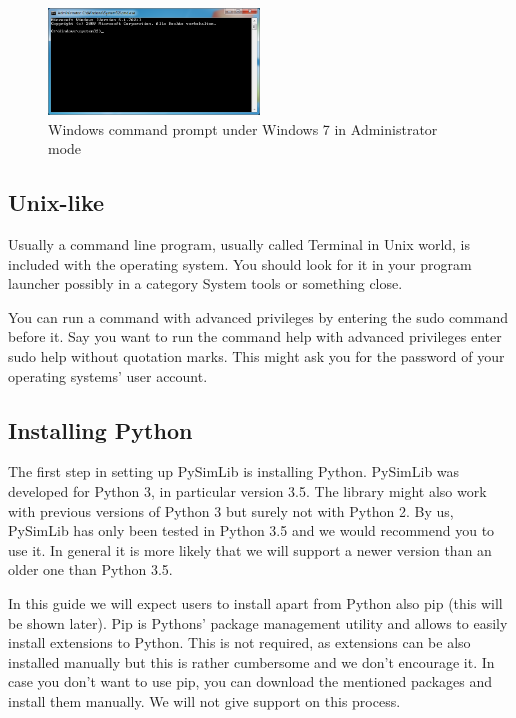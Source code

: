 \begin{figure}[h]
	\centering
	\includegraphics[width=0.5\textwidth]{images/cmd.png}
	\caption{Windows command prompt under Windows 7 in Administrator mode}
	\label{wincmd}
\end{figure}



\subsection{Unix-like}
Usually a command line program, usually called Terminal in Unix world, is included with the operating system.
You should look for it in your program launcher possibly in a category \grqq{}System tools\grqq{} or something close.

You can run a command with advanced privileges by entering the \grqq{}sudo\grqq{} command before it.
Say you want to run the command \grqq{}help\grqq{} with advanced privileges enter \grqq{}sudo help\grqq{} without quotation marks.
This might ask you for the password of your operating systems' user account.





\subsection{Installing Python}

The first step in setting up PySimLib is installing Python.
PySimLib was developed for Python 3, in particular version 3.5.
The library might also work with previous versions of Python 3 but surely not with Python 2.
By us, PySimLib has only been tested in Python 3.5 and we would recommend you to use it.
In general it is more likely that we will support a newer version than an older one than Python 3.5.

In this guide we will expect users to install apart from Python also \grqq{}pip\grqq{} (this will be shown later).
Pip is Pythons' package management utility and allows to easily install extensions to Python.
This is not required, as extensions can be also installed manually but this is rather cumbersome and we don't encourage it.
In case you don't want to use pip, you can download the mentioned packages and install them manually.
We will not give support on this process.


